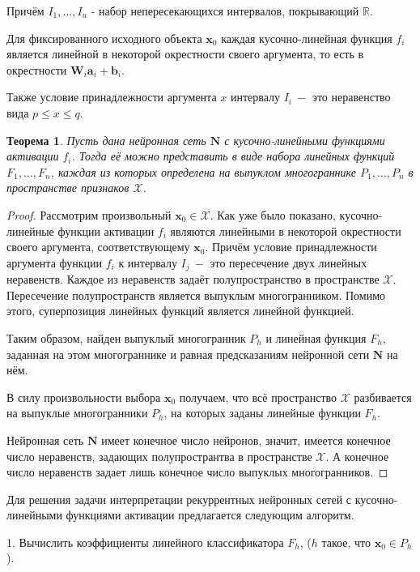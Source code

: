 \documentclass[a4paper, 12pt]{article}
\newtheorem{theorem}{Теорема}
\begin{document}
Причём $I_1,\dots,I_u$ - набор непересекающихся интервалов, покрывающий $\mathbb{R}$.

Для фиксированного исходного объекта $\mathbf{x}_0$ каждая кусочно-линейная функция $f_i$ является линейной в некоторой окрестности своего аргумента, то есть в окрестности $\mathbf{W}_i \mathbf{a}_{i} + \mathbf{b}_i$.

Также условие принадлежности аргумента $x$ интервалу $I_i~-$ это неравенство вида $p \leq x \leq q$.

\begin{theorem}
Пусть дана нейронная сеть $\mathbf{N}$ с кусочно-линейными функциями активации $f_i$. Тогда её можно представить в виде набора линейных функций $F_1,\dots,F_n$, каждая из которых определена на выпуклом многограннике $P_1,\dots,P_n$ в пространстве признаков $\mathcal{X}$.
\end{theorem}
\begin{proof}
Рассмотрим произвольный $\mathbf{x}_0\in\mathcal{X}$. Как уже было показано, кусочно-линейные функции активации $f_i$ являются линейными в некоторой окрестности своего аргумента, соответствующему $\mathbf{x}_0$. Причём условие принадлежности аргумента функции $f_i$ к интервалу $I_j~-$ это пересечение двух линейных неравенств. Каждое из неравенств задаёт полупространство в пространстве $\mathcal{X}$. Пересечение полупространств является выпуклым многогранником. Помимо этого, суперпозиция линейных функций является линейной функцией.

Таким образом, найден выпуклый многогранник $P_h$ и линейная функция $F_h$, заданная на этом многограннике и равная предсказаниям нейронной сети $\mathbf{N}$ на нём.

В силу произвольности выбора $\mathbf{x}_0$ получаем, что всё пространство $\mathcal{X}$ разбивается на выпуклые многогранники $P_h$, на которых заданы линейные функции $F_h$.

Нейронная сеть $\mathbf{N}$ имеет конечное число нейронов, значит, имеется конечное число неравенств, задающих полупространтва в пространстве $\mathcal{X}$. А конечное число неравенств задает лишь конечное число выпуклых многогранников. 
\end{proof}

Для решения задачи интерпретации рекуррентных нейронных сетей с кусочно-линейными функциями активации предлагается следующим алгоритм.

1. Вычислить коэффициенты линейного классификатора $F_h$, ($h$ такое, что $\mathbf{x}_0\in P_h$).
\end{document}
